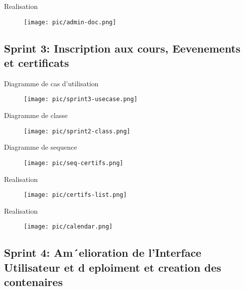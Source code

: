 \documentclass{beamer}
\begin{document}
\begin{frame}{Realisation}
    \begin{figure}[htpb]
        \centering
        \texttt{[image: pic/admin-doc.png]}
    \end{figure}
\end{frame}



\subsection{Sprint 3: Inscription aux cours, Eevenements et
    certificats}
\begin{frame}{Diagramme de cas d'utilisation}

    \begin{figure}[htpb]
        \centering
        \texttt{[image: pic/sprint3-usecase.png]}
    \end{figure}
\end{frame}

\begin{frame}{Diagramme de classe}

    \begin{figure}[htpb]
        \centering
        \texttt{[image: pic/sprint2-class.png]}
    \end{figure}
\end{frame}


\begin{frame}{Diagramme de sequence}
    \begin{figure}[htpb]
        \centering
        \texttt{[image: pic/seq-certifs.png]}
    \end{figure}
\end{frame}

\begin{frame}{Realisation}
    \begin{figure}[htpb]
        \centering
        \texttt{[image: pic/certifs-list.png]}
    \end{figure}
\end{frame}

\begin{frame}{Realisation}
    \begin{figure}[htpb]
        \centering
        \texttt{[image: pic/calendar.png]}
    \end{figure}
\end{frame}


\subsection{Sprint 4: Am´elioration de l’Interface Utilisateur et d eploiment et creation des
    contenaires}
\end{document}

